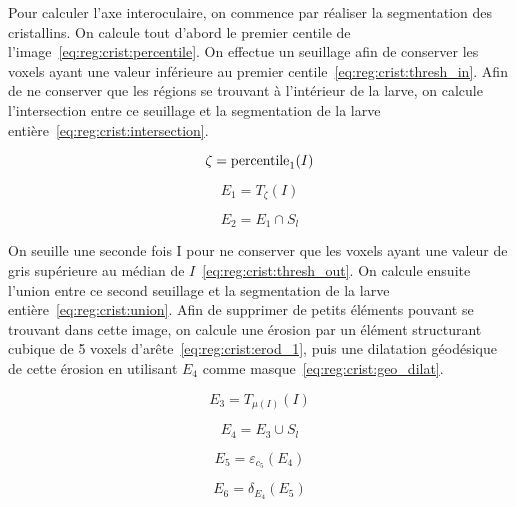 \documentclass[\main/main.tex]{subfiles}
\begin{document}
%
Pour calculer l'axe interoculaire, on commence par réaliser la segmentation des cristallins.
%
On calcule tout d'abord le premier centile de l'image~\eqref{eq:reg:crist:percentile}.
%
On effectue un seuillage afin de conserver les voxels ayant une valeur inférieure au premier centile~\eqref{eq:reg:crist:thresh_in}.
%
Afin de ne conserver que les régions se trouvant à l'intérieur de la larve, on calcule l'intersection entre ce seuillage et la segmentation de la larve entière~\eqref{eq:reg:crist:intersection}.
%

\begin{equation}
    \label{eq:reg:crist:percentile}
    \zeta = \operatorname{\textnormal{percentile}}_1(I) 
\end{equation}

\begin{equation}
    \label{eq:reg:crist:thresh_in}
    E_1= T_{\zeta}(I) 
\end{equation}

\begin{equation}
    \label{eq:reg:crist:intersection}
    E_2 = E_1 \cap S_l
\end{equation}

%
On seuille une seconde fois I pour ne conserver que les voxels ayant une valeur de gris supérieure au médian de $I$~\eqref{eq:reg:crist:thresh_out}.
%
On calcule ensuite l'union entre ce second seuillage et la segmentation de la larve entière~\eqref{eq:reg:crist:union}.
%
Afin de supprimer de petits éléments pouvant se trouvant dans cette image, on calcule une érosion par un élément structurant cubique de 5 voxels d'arête~\eqref{eq:reg:crist:erod_1}, puis une dilatation géodésique de cette érosion en utilisant $E_4$ comme masque~\eqref{eq:reg:crist:geo_dilat}.

\begin{equation}
    \label{eq:reg:crist:thresh_out}
    E_3= T_{\mu(I)}(I) 
\end{equation}

\begin{equation}
    \label{eq:reg:crist:union}
    E_4= E_3 \cup S_l
\end{equation}

\begin{equation}
    \label{eq:reg:crist:erod_1}
    E_5= \varepsilon_{c_5}(E_4)
\end{equation}

\begin{equation}
    \label{eq:reg:crist:geo_dilat}
    E_6= \delta_{E_4}(E_5)
\end{equation}
\end{document}
